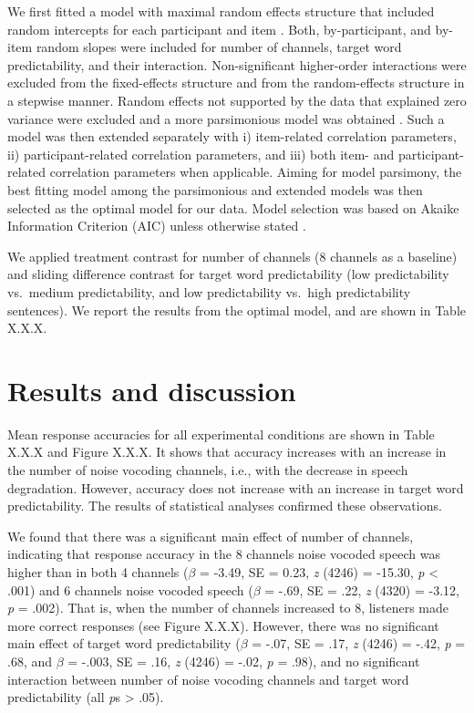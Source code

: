 \documentclass[a4paper, nobind]{templates/ociamthesis}
\begin{document}
We first fitted a model with maximal random effects structure that included random intercepts for each participant and item \autocite{Barr2013}.
Both, by-participant, and by-item random slopes were included for number of channels, target word predictability, and their interaction.
Non-significant higher-order interactions were excluded from the fixed-effects structure and from the random-effects structure in a stepwise manner.
Random effects not supported by the data that explained zero variance were excluded and a more parsimonious model was obtained \autocite{Bates2015a}.
Such a model was then extended separately with i) item-related correlation parameters, ii) participant-related correlation parameters, and iii) both item- and participant-related correlation parameters when applicable.
Aiming for model parsimony, the best fitting model among the parsimonious and extended models was then selected as the optimal model for our data. Model selection was based on Akaike Information Criterion (AIC) unless otherwise stated \autocite{Burnham2002,Grueber2011,Richards2011}.

We applied treatment contrast for number of channels (8 channels as a baseline) and sliding difference contrast for target word predictability (low predictability vs.~medium predictability, and low predictability vs.~high predictability sentences).
We report the results from the optimal model, and are shown in Table X.X.X.

\hypertarget{results-and-discussion}{%
\section{Results and discussion}\label{results-and-discussion}}

Mean response accuracies for all experimental conditions are shown in Table X.X.X and Figure X.X.X.
It shows that accuracy increases with an increase in the number of noise vocoding channels, i.e., with the decrease in speech degradation.
However, accuracy does not increase with an increase in target word predictability.
The results of statistical analyses confirmed these observations.

We found that there was a significant main effect of number of channels, indicating that response accuracy in the 8 channels noise vocoded speech was higher than in both 4 channels (\(\beta\) = -3.49, SE = 0.23, \emph{z} (4246) = -15.30, \emph{p} \textless{} .001) and 6 channels noise vocoded speech (\(\beta\) = -.69, SE = .22, \emph{z} (4320) = -3.12, \emph{p} = .002).
That is, when the number of channels increased to 8, listeners made more correct responses (see Figure X.X.X).
However, there was no significant main effect of target word predictability (\(\beta\) = -.07, SE = .17, \emph{z} (4246) = -.42, \emph{p} = .68, and \(\beta\) = -.003, SE = .16, \emph{z} (4246) = -.02, \emph{p} = .98), and no significant interaction between number of noise vocoding channels and target word predictability (all \emph{p}s \textgreater{} .05).
\end{document}
